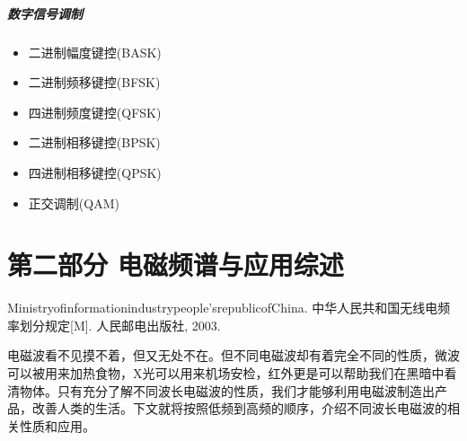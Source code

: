 \documentclass[UTF8]{article}
\begin{document}
\begin{CJK}{UTF8}{gkai}
\subsubsection{数字信号调制}
\begin{itemize}
\item  二进制幅度键控(BASK)
\item  二进制频移键控(BFSK)
\item  四进制频度键控(QFSK)
\item  二进制相移键控(BPSK)
\item  四进制相移键控(QPSK)
\item  正交调制(QAM)
\end{itemize}
\clearpage
\part{第二部分 电磁频谱与应用综述}

Ministryofinformationindustrypeople'srepublicofChina. 中华人民共和国无线电频率划分规定[M]. 人民邮电出版社, 2003.

电磁波看不见摸不着，但又无处不在。但不同电磁波却有着完全不同的性质，微波可以被用来加热食物，X光可以用来机场安检，红外更是可以帮助我们在黑暗中看清物体。只有充分了解不同波长电磁波的性质，我们才能够利用电磁波制造出产品，改善人类的生活。下文就将按照低频到高频的顺序，介绍不同波长电磁波的相关性质和应用。


\end{CJK}
\end{document}

